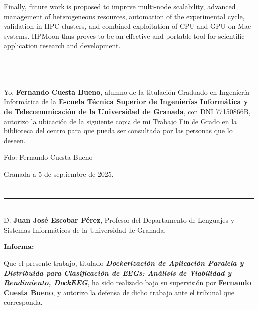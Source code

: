 Finally, future work is proposed to improve multi-node scalability, advanced management of heterogeneous resources, automation of the experimental cycle, validation in HPC clusters, and combined exploitation of CPU and GPU on Mac systems. HPMoon thus proves to be an effective and portable tool for scientific application research and development.

\chapter*{}
\thispagestyle{empty}

\noindent\rule[-1ex]{\textwidth}{2pt}\\[4.5ex]

Yo, \textbf{Fernando Cuesta Bueno}, alumno de la titulación Graduado en Ingeniería Informática de la \textbf{Escuela Técnica Superior
       de Ingenierías Informática y de Telecomunicación de la Universidad de Granada}, con DNI 77150866B, autorizo la
ubicación de la siguiente copia de mi Trabajo Fin de Grado en la biblioteca del centro para que pueda ser
consultada por las personas que lo deseen.

\vspace{6cm}

\noindent Fdo: Fernando Cuesta Bueno

\vspace{2cm}

\begin{flushright}
       Granada a 5 de septiembre de 2025.
\end{flushright}


\chapter*{}
\thispagestyle{empty}

\noindent\rule[-1ex]{\textwidth}{2pt}\\[4.5ex]

D. \textbf{Juan José Escobar Pérez}, Profesor del Departamento de Lenguajes y Sistemas Informáticos de la Universidad de Granada.

\vspace{0.5cm}

\textbf{Informa:}

\vspace{0.5cm}

Que el presente trabajo, titulado \textit{\textbf{Dockerización de Aplicación Paralela y Distribuida para Clasificación de EEGs: Análisis de Viabilidad y Rendimiento, DockEEG}},
ha sido realizado bajo su supervisión por \textbf{Fernando Cuesta Bueno}, y autorizo la defensa de dicho trabajo ante el tribunal
que corresponda.

